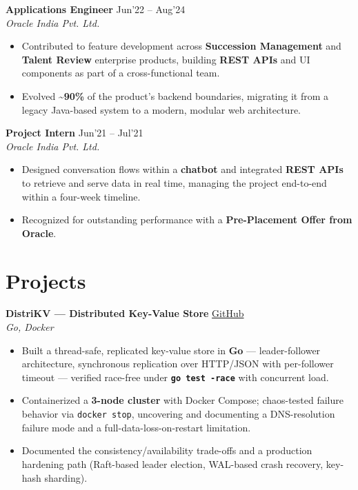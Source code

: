 \documentclass[10pt,a4paper]{article}
\newcommand{\resumeItem}[1]{\item[\textcolor{primary}{\textbullet}] #1}
\begin{document}
\vspace{1pt}
\textbf{Applications Engineer} \hfill Jun'22 -- Aug'24\\
\textit{Oracle India Pvt. Ltd.}
\begin{itemize}[leftmargin=1.05em, nosep, topsep=0pt, itemsep=0pt, parsep=0pt]
    \resumeItem{Contributed to feature development across \textbf{Succession Management} and \textbf{Talent Review} enterprise products, building \textbf{REST APIs} and UI components as part of a cross-functional team.}
    \resumeItem{Evolved \textbf{\textasciitilde90\%} of the product's backend boundaries, migrating it from a legacy Java-based system to a modern, modular web architecture.}
\end{itemize}

\vspace{1pt}
\textbf{Project Intern} \hfill Jun'21 -- Jul'21\\
\textit{Oracle India Pvt. Ltd.}
\begin{itemize}[leftmargin=1.05em, nosep, topsep=0pt, itemsep=0pt, parsep=0pt]
    \resumeItem{Designed conversation flows within a \textbf{chatbot} and integrated \textbf{REST APIs} to retrieve and serve data in real time, managing the project end-to-end within a four-week timeline.}
    \resumeItem{Recognized for outstanding performance with a \textbf{Pre-Placement Offer from Oracle}.}
\end{itemize}

\section{Projects}
\small

\textbf{DistriKV --- Distributed Key-Value Store} \hfill \href{https://github.com/bhaskar193/distrikv}{GitHub} \\
\textit{Go, Docker}
\begin{itemize}[leftmargin=1.05em, nosep, topsep=0pt, itemsep=0pt, parsep=0pt]
    \resumeItem{Built a thread-safe, replicated key-value store in \textbf{Go} --- leader-follower architecture, synchronous replication over HTTP/JSON with per-follower timeout --- verified race-free under \textbf{\texttt{go test -race}} with concurrent load.}
    \resumeItem{Containerized a \textbf{3-node cluster} with Docker Compose; chaos-tested failure behavior via \texttt{docker stop}, uncovering and documenting a DNS-resolution failure mode and a full-data-loss-on-restart limitation.}
    \resumeItem{Documented the consistency/availability trade-offs and a production hardening path (Raft-based leader election, WAL-based crash recovery, key-hash sharding).}
\end{itemize}
\end{document}
